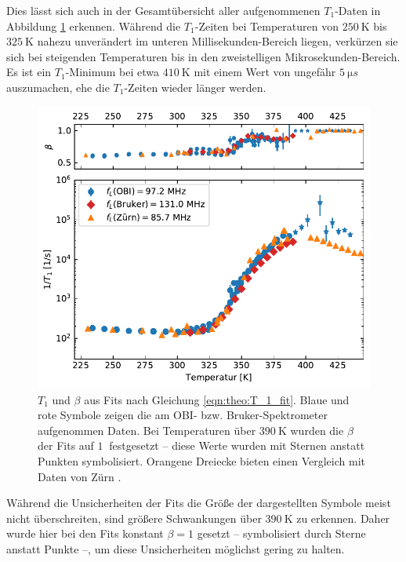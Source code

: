 Dies lässt sich auch in der Gesamtübersicht aller aufgenommenen $T_1$-Daten in Abbildung \ref{fig:res:T_1} erkennen. Während die $T_1$-Zeiten bei Temperaturen von $\SI{250}{\kelvin}$ bis $\SI{325}{\kelvin}$ nahezu unverändert im unteren Millisekunden-Bereich liegen, verkürzen sie sich bei steigenden Temperaturen bis in den zweistelligen Mikrosekunden-Bereich. Es ist ein $T_1$-Minimum bei etwa $\SI{410}{\kelvin}$ mit einem Wert von ungefähr $\SI{5}{\micro s}$ auszumachen, ehe die $T_1$-Zeiten wieder länger werden.
\begin{figure}
	\begin{center}
		\includegraphics[width=\textwidth]{graphics/plot/t1.pdf}
	\end{center}
	\caption{$T_1$ und $\beta$ aus Fits nach Gleichung \eqref{eqn:theo:T_1_fit}. Blaue und rote Symbole zeigen die am OBI- bzw. Bruker-Spektrometer aufgenommen Daten. Bei Temperaturen über $\SI{390}{\kelvin}$ wurden die $\beta$ der Fits auf $\SI{1}{}$ festgesetzt -- diese Werte wurden mit Sternen anstatt Punkten symbolisiert. Orangene Dreiecke bieten einen Vergleich mit Daten von Zürn \cite{zuern_paper}.} \label{fig:res:T_1}
\end{figure}

Während die Unsicherheiten der Fits die Größe der dargestellten Symbole meist nicht überschreiten, sind größere Schwankungen über $\SI{390}{\kelvin}$ zu erkennen. Daher wurde hier bei den Fits konstant $\beta = 1$ gesetzt -- symbolisiert durch Sterne anstatt Punkte --, um diese Unsicherheiten möglichst gering zu halten.


